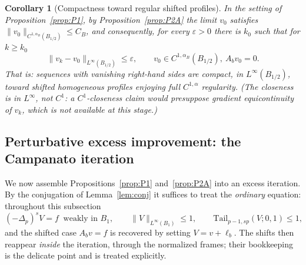\documentclass[11pt]{amsart}
\theoremstyle{plain}
\newtheorem{corollary}[theorem]{Corollary}
\theoremstyle{definition}
\theoremstyle{remark}
\newcommand{\fpl}[1]{(-\Delta_p)^{s}#1}
\newcommand{\al}{\alpha}
\newcommand{\Tail}{\mathrm{Tail}_{p-1,sp}}
\begin{document}
\begin{corollary}[Compactness toward regular shifted profiles]\label{cor:P1P2}
In the setting of
Proposition~\ref{prop:P1}, by Proposition~\ref{prop:P2A} the limit $v_0$ satisfies
$\|v_0\|_{C^{1,\al_B}(B_{1/2})}\le C_B$, and consequently, for every
$\varepsilon>0$ there is $k_0$ such that for $k\ge k_0$
\[
  \|v_k-v_0\|_{L^\infty(B_{1/2})}\le\varepsilon,
  \qquad v_0\in C^{1,\al_B}(B_{1/2}),\ A_bv_0=0 .
\]
That is: sequences with vanishing right-hand sides are compact, in
$L^\infty(B_{1/2})$, toward shifted homogeneous profiles enjoying full
$C^{1,\al}$ regularity. \textnormal{(}The closeness is in $L^\infty$, not
$C^1$: a $C^1$-closeness claim would presuppose gradient equicontinuity of
$v_k$, which is not available at this stage.\textnormal{)}
\end{corollary}

\subsection{Perturbative excess improvement: the Campanato iteration}
\label{ssec:excess}
We now assemble Propositions~\ref{prop:P1} and~\ref{prop:P2A} into an excess
iteration. By the conjugation of Lemma~\ref{lem:conj} it suffices to treat
the \emph{ordinary} equation: throughout this subsection
\[
  \fpl{V}=f\ \text{ weakly in }B_1,\qquad
  \|V\|_{L^\infty(B_1)}\le1,\qquad \Tail(V;0,1)\le1 ,
\]
and the shifted case $A_bv=f$ is recovered by setting $V=v+\ell_b$. The
shifts then reappear \emph{inside} the iteration, through the normalized
frames; their bookkeeping is the delicate point and is treated explicitly.
\end{document}
